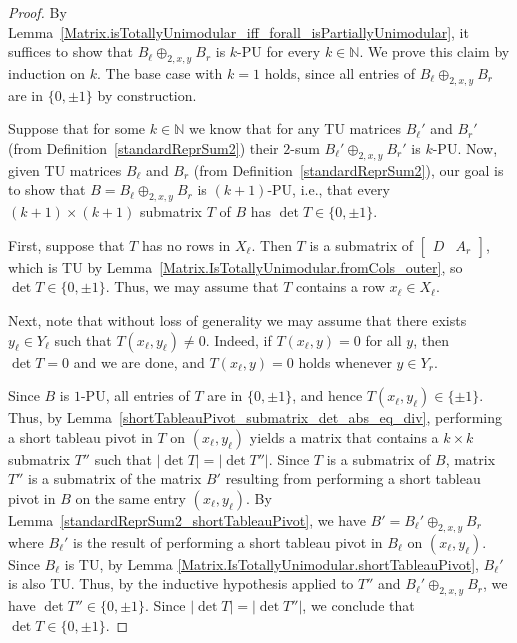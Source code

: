 \begin{proof}
    \leanok
    By Lemma~\ref{Matrix.isTotallyUnimodular_iff_forall_isPartiallyUnimodular}, it suffices to show that $B_{\ell} \oplus_{2, x, y} B_{r}$ is $k$-PU for every $k \in \mathbb{N}$. We prove this claim by induction on $k$. The base case with $k = 1$ holds, since all entries of $B_{\ell} \oplus_{2, x, y} B_{r}$ are in $\{0, \pm 1\}$ by construction.

    Suppose that for some $k \in \mathbb{N}$ we know that for any TU matrices $B_{\ell}'$ and $B_{r}'$ (from Definition~\ref{standardReprSum2}) their $2$-sum $B_{\ell}' \oplus_{2, x, y} B_{r}'$ is $k$-PU. Now, given TU matrices $B_{\ell}$ and $B_{r}$ (from Definition~\ref{standardReprSum2}), our goal is to show that $B = B_{\ell} \oplus_{2, x, y} B_{r}$ is $(k + 1)$-PU, i.e., that every $(k + 1) \times (k + 1)$ submatrix $T$ of $B$ has $\det T \in \{0, \pm 1\}$.

    First, suppose that $T$ has no rows in $X_{\ell}$. Then $T$ is a submatrix of $\begin{bmatrix} D & A_{r} \end{bmatrix}$, which is TU by Lemma~\ref{Matrix.IsTotallyUnimodular.fromCols_outer}, so $\det T \in \{0, \pm 1\}$. Thus, we may assume that $T$ contains a row $x_{\ell} \in X_{\ell}$.

    Next, note that without loss of generality we may assume that there exists $y_{\ell} \in Y_{\ell}$ such that $T (x_{\ell}, y_{\ell}) \neq 0$. Indeed, if $T (x_{\ell}, y) = 0$ for all $y$, then $\det T = 0$ and we are done, and $T (x_{\ell}, y) = 0$ holds whenever $y \in Y_{r}$.

    Since $B$ is $1$-PU, all entries of $T$ are in $\{0, \pm 1\}$, and hence $T (x_{\ell}, y_{\ell}) \in \{\pm 1\}$. Thus, by Lemma~\ref{shortTableauPivot_submatrix_det_abs_eq_div}, performing a short tableau pivot in $T$ on $(x_{\ell}, y_{\ell})$ yields a matrix that contains a $k \times k$ submatrix $T''$ such that $|\det T| = |\det T''|$. Since $T$ is a submatrix of $B$, matrix $T''$ is a submatrix of the matrix $B'$ resulting from performing a short tableau pivot in $B$ on the same entry $(x_{\ell}, y_{\ell})$. By Lemma~\ref{standardReprSum2_shortTableauPivot}, we have $B' = B_{\ell}' \oplus_{2, x, y} B_{r}$ where $B_{\ell}'$ is the result of performing a short tableau pivot in $B_{\ell}$ on $(x_{\ell}, y_{\ell})$. Since $B_{\ell}$ is TU, by Lemma \ref{Matrix.IsTotallyUnimodular.shortTableauPivot}, $B_{\ell}'$ is also TU. Thus, by the inductive hypothesis applied to $T''$ and $B_{\ell}' \oplus_{2, x, y} B_{r}$, we have $\det T'' \in \{0, \pm 1\}$. Since $|\det T| = |\det T''|$, we conclude that $\det T \in \{0, \pm 1\}$.
\end{proof}

